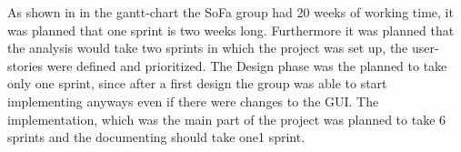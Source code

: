 As shown in in the gantt-chart the SoFa group had 20 weeks of working time, it was planned that one sprint is two weeks long. Furthermore it was planned that the analysis would take two sprints in which the project was set up, the user-stories were defined and prioritized. The Design phase was the planned to take only one sprint, since after a first design the group was able to start implementing anyways even if there were changes to the GUI.
The implementation, which was the main part of the project was planned to take 6 sprints and the documenting should take one1 sprint. 
